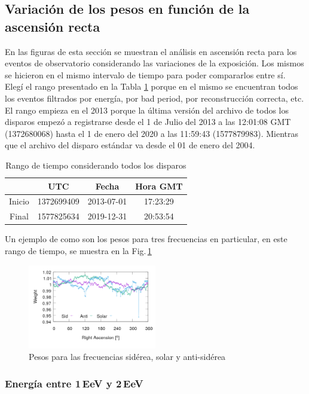 \subsection{Variación de los pesos en función de la ascensión recta}
En las figuras de esta sección se muestran el análisis en ascensión recta para los eventos de observatorio considerando las variaciones de la exposición. 
Los mismos se hicieron en el mismo intervalo de tiempo para poder compararlos entre sí. Elegí el rango presentado en la Tabla \ref{rango_corto}  porque en el mismo se encuentran todos los eventos filtrados por energía, por bad period, por reconstrucción correcta, etc. El rango empieza en el 2013 porque la última versión del archivo de todos los disparos empezó a registrarse desde el  1 de Julio del 2013 a las 12:01:08 GMT (1372680068) hasta el  1 de enero del 2020 a las 11:59:43 (1577879983). Mientras que el archivo del disparo estándar va desde el 01 de enero del 2004.

	\begin{table}[H]
	\centering
		\begin{tabular}{c|c|c|c}
	 		& UTC 			& Fecha		 	&  Hora GMT  \\ \hline
	Inicio	& 1372699409	&2013-07-01 	&17:23:29		\\
	Final 	& 1577825634	&2019-12-31 	&20:53:54		\\
		\end{tabular}
	\caption{Rango de tiempo considerando todos los disparos} 	\label{rango_corto}
	\end{table}


Un ejemplo de como son los pesos para tres frecuencias en particular, en este rango de tiempo, se muestra en la Fig.\,\ref{fig:pesos}


\begin{figure}[H]
	\centering
	\includegraphics[width=0.5\textwidth]{pesos_side_sola_anti.png}
	\caption{Pesos para las frecuencias sidérea, solar y anti-sidérea}
	\label{fig:pesos}
\end{figure}


\subsubsection{Energía entre 1\,EeV y 2\,EeV}

